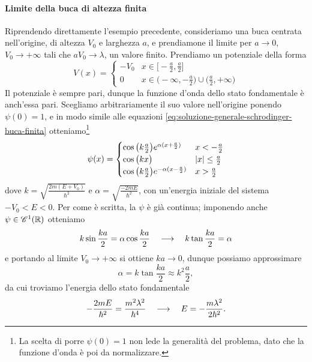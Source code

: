 \paragraph{Limite della buca di altezza finita}
Riprendendo direttamente l'esempio precedente, consideriamo una buca centrata nell'origine, di altezza $V_0$ e larghezza $a$, e prendiamone il limite per $a\to 0$, $V_0\to+\infty$ tali che $aV_0\to\lambda$, un valore finito.
Prendiamo un potenziale della forma
\begin{equation}
	V(x)=
	\begin{cases}
		-V_0	&x\in\big[-\frac{a}2,\frac{a}2\big]\\
		0		&x\in\big(-\infty,-\frac{a}2\big)\cup\big(\frac{a}2,+\infty\big)
	\end{cases}
\end{equation}
Il potenziale è sempre pari, dunque la funzione d'onda dello stato fondamentale è anch'essa pari.
Scegliamo arbitrariamente il suo valore nell'origine ponendo $\psi(0)=1$, e in modo simile alle equazioni \eqref{eq:soluzione-generale-schrodinger-buca-finita} otteniamo\footnote{La scelta di porre $\psi(0)=1$ non lede la generalità del problema, dato che la funzione d'onda è poi da normalizzare.}
\begin{equation}
	\psi(x)=
	\begin{cases}
		\cos\big(k\frac{a}2\big)e^{\alpha(x+\frac{a}2)}		&x<-\frac{a}2\\
		\cos\big(kx\big)									&\abs{x}\le\frac{a}2\\
		\cos\big(k\frac{a}2\big)e^{-\alpha(x-\frac{a}2)}	&x>\frac{a}2
	\end{cases}
	\label{eq:soluzione-generale-delta-attrattivo}
\end{equation}
dove $k=\sqrt{\frac{2m(E+V_0)}{\hbar^2}}$ e $\alpha=\sqrt{\frac{-2mE}{\hbar^2}}$, con un'energia iniziale del sistema $-V_0<E<0$.
Per come è scritta, la $\psi$ è già continua; imponendo anche $\psi\in\cont[1]{\R}$ otteniamo
\begin{equation}
	k\sin\frac{ka}2=\alpha\cos\frac{ka}2\qqq k\tan\frac{ka}2=\alpha
	\label{eq:condizione-C1-delta-attrattivo}
\end{equation}
e portando al limite $V_0\to+\infty$ si ottiene $ka\to 0$, dunque possiamo approssimare
\begin{equation}
	\alpha=k\tan\frac{ka}2\approx k^2\frac{a}2,
\end{equation}
da cui troviamo l'energia dello stato fondamentale
\begin{equation}
	-\frac{2mE}{\hbar^2}=\frac{m^2\lambda^2}{\hbar^4}\qqq E=-\frac{m\lambda^2}{2\hbar^2}.
	\label{eq:E-fondamentale-delta-attrattivo}
\end{equation}
